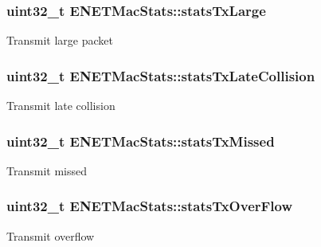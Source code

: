 \subsubsection[{\texorpdfstring{stats\+Tx\+Large}{statsTxLarge}}]{\setlength{\rightskip}{0pt plus 5cm}uint32\+\_\+t E\+N\+E\+T\+Mac\+Stats\+::stats\+Tx\+Large}\hypertarget{structENETMacStats_ad1ed9420ea656dfecd27d4ba3c4e0316}{}\label{structENETMacStats_ad1ed9420ea656dfecd27d4ba3c4e0316}
Transmit large packet 
\subsubsection[{\texorpdfstring{stats\+Tx\+Late\+Collision}{statsTxLateCollision}}]{\setlength{\rightskip}{0pt plus 5cm}uint32\+\_\+t E\+N\+E\+T\+Mac\+Stats\+::stats\+Tx\+Late\+Collision}\hypertarget{structENETMacStats_a58ac8e39beaa9ef61565b6e4be2c8214}{}\label{structENETMacStats_a58ac8e39beaa9ef61565b6e4be2c8214}
Transmit late collision 
\subsubsection[{\texorpdfstring{stats\+Tx\+Missed}{statsTxMissed}}]{\setlength{\rightskip}{0pt plus 5cm}uint32\+\_\+t E\+N\+E\+T\+Mac\+Stats\+::stats\+Tx\+Missed}\hypertarget{structENETMacStats_ac27b873594607415fd1228f328014006}{}\label{structENETMacStats_ac27b873594607415fd1228f328014006}
Transmit missed 
\subsubsection[{\texorpdfstring{stats\+Tx\+Over\+Flow}{statsTxOverFlow}}]{\setlength{\rightskip}{0pt plus 5cm}uint32\+\_\+t E\+N\+E\+T\+Mac\+Stats\+::stats\+Tx\+Over\+Flow}\hypertarget{structENETMacStats_a5a92aca891bc5d7e0889b25f2bcaf5d3}{}\label{structENETMacStats_a5a92aca891bc5d7e0889b25f2bcaf5d3}
Transmit overflow 
